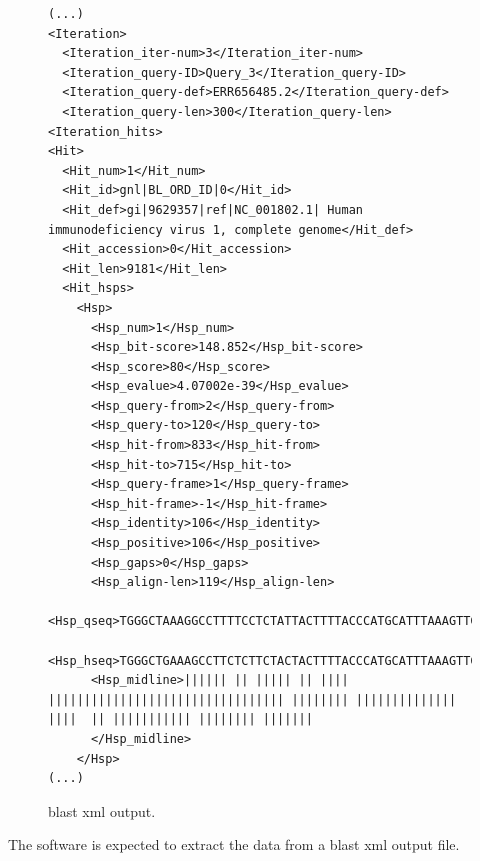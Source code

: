 \begin{figure}[h!]
\begin{lstlisting}
(...)
<Iteration>
  <Iteration_iter-num>3</Iteration_iter-num>
  <Iteration_query-ID>Query_3</Iteration_query-ID>
  <Iteration_query-def>ERR656485.2</Iteration_query-def>
  <Iteration_query-len>300</Iteration_query-len>
<Iteration_hits>
<Hit>
  <Hit_num>1</Hit_num>
  <Hit_id>gnl|BL_ORD_ID|0</Hit_id>
  <Hit_def>gi|9629357|ref|NC_001802.1| Human immunodeficiency virus 1, complete genome</Hit_def>
  <Hit_accession>0</Hit_accession>
  <Hit_len>9181</Hit_len>
  <Hit_hsps>
    <Hsp>
      <Hsp_num>1</Hsp_num>
      <Hsp_bit-score>148.852</Hsp_bit-score>
      <Hsp_score>80</Hsp_score>
      <Hsp_evalue>4.07002e-39</Hsp_evalue>
      <Hsp_query-from>2</Hsp_query-from>
      <Hsp_query-to>120</Hsp_query-to>
      <Hsp_hit-from>833</Hsp_hit-from>
      <Hsp_hit-to>715</Hsp_hit-to>
      <Hsp_query-frame>1</Hsp_query-frame>
      <Hsp_hit-frame>-1</Hsp_hit-frame>
      <Hsp_identity>106</Hsp_identity>
      <Hsp_positive>106</Hsp_positive>
      <Hsp_gaps>0</Hsp_gaps>
      <Hsp_align-len>119</Hsp_align-len>
      <Hsp_qseq>TGGGCTAAAGGCCTTTTCCTCTATTACTTTTACCCATGCATTTAAAGTTCTAGGTGACATGGCCTGGTG(*@@*)TACCATTTGCCCTTGGAGATTTTGCACTATAGGATAATTTTGACTGACCT</Hsp_qseq>
      <Hsp_hseq>TGGGCTGAAAGCCTTCTCTTCTACTACTTTTACCCATGCATTTAAAGTTCTAGGTGATATGGCCTGATG(*@@*)TACCATTTGCCCCTGGATGTTCTGCACTATAGGGTAATTTTGGCTGACCT</Hsp_hseq>
      <Hsp_midline>|||||| || ||||| || |||| ||||||||||||||||||||||||||||||||| |||||||| |||||||||||||| ||||  || ||||||||||| |||||||| |||||||
      </Hsp_midline>
    </Hsp>
(...)
\end{lstlisting}
\caption{\acrshort{blast} \acrshort{xml} output.}
\label{fig:xmlExample}
\end{figure}

The software is expected to extract the data from a \gls{blast} \gls{xml} output file.


